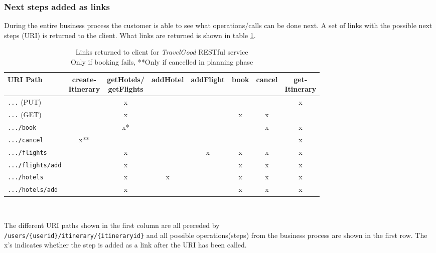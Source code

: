 \subsubsection*{Next steps added as links}
During the entire business process the customer is able to see what operations/calls can be done next. A set of links with the possible next steps (URI) is returned to the client. What links are returned is shown in table \ref{tableLinks}. 

\begin{table}[H]
\begin{adjustwidth}{-1cm}{-1cm}
\centering
\begin{tabular}{|l|c|c|c|c|c|c|c|} \hline
URI Path & \shortstack{create- \\ Itinerary} & \shortstack{getHotels/ \\ getFlights} & addHotel & addFlight & book & cancel & \shortstack{get- \\ Itinerary}\\ \hline
\texttt{...} (PUT) 			&	&x	&	&	&	&	&x\\ \hline
\texttt{...} (GET) 			&	&x	&	&	&x	&x	&\\ \hline
\texttt{.../book} 			&	&x*	&	&	&	&x	&x\\ \hline
\texttt{.../cancel} 		&x**&	&	&	&	&	&x\\ \hline
\texttt{.../flights}		&	&x	&	&x	&x	&x	&x\\ \hline
\texttt{.../flights/add} 	&	&x	&	&	&x	&x	&x\\ \hline
\texttt{.../hotels }		&	&x	&x	&	&x	&x	&x\\ \hline
\texttt{.../hotels/add} 	&	&x	&	&	&x	&x	&x\\ \hline
\end{tabular}\\
\captionsetup{justification=centering}
\caption{Links returned to client for \textit{TravelGood} RESTful service \\ \footnotesize *Only if booking fails, **Only if cancelled in planning phase}
\label{tableLinks}
\end{adjustwidth}
\end{table}

The different URI paths shown in the first column are all preceded by\\ \texttt{/users/\{userid\}/itinerary/\{itineraryid\}} and all possible operations(steps) from the business process are shown in the first row. 
The x’s indicates whether the step is added as a link after the URI has been called. 

